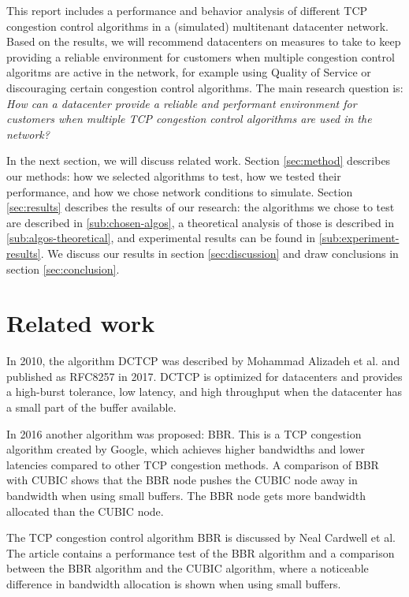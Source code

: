 \documentclass{article}
\begin{document}
This report includes a performance and behavior analysis of different TCP congestion control algorithms in a (simulated) multitenant datacenter network. Based on the results, we will recommend datacenters on measures to take to keep providing a reliable environment for customers when multiple congestion control algoritms are active in the network, for example using Quality of Service or discouraging certain congestion control algorithms. The main research question is: {\it How can a datacenter provide a reliable and performant environment for customers when multiple TCP congestion control algorithms are used in the
network?}

In the next section, we will discuss related work. Section \ref{sec:method}
describes our methods: how we selected algorithms to test, how we tested their
performance, and how we chose network conditions to simulate. Section
\ref{sec:results} describes the results of our research: the algorithms we
chose to test are described in \ref{sub:chosen-algos}, a theoretical analysis
of those is described in \ref{sub:algos-theoretical}, and experimental results
can be found in \ref{sub:experiment-results}. We discuss our results in section
\ref{sec:discussion} and draw conclusions in section \ref{sec:conclusion}.


\section{Related work}

In 2010, the algorithm DCTCP was described by Mohammad Alizadeh et
al.\cite{dctcp-congestion-original} and published as
RFC8257\cite{dctcp-congestion} in 2017. DCTCP is optimized for datacenters and
provides a high-burst tolerance, low latency, and high throughput when the
datacenter has a small part of the buffer available\cite{dctcp-congestion}.

In 2016 another algorithm was proposed: BBR. This is a TCP congestion algorithm
created by Google, which achieves higher bandwidths and lower latencies
compared to other TCP congestion methods\cite{bbr-congestion}. A comparison of
BBR with CUBIC\cite{bbr-congestion-comparison} shows that the BBR node pushes
the CUBIC node away in bandwidth when using small buffers. The BBR node gets
more bandwidth allocated than the CUBIC node.

The TCP congestion control algorithm BBR is discussed by Neal Cardwell et
al.\cite{bbr-congestion} The article contains a performance test of the BBR
algorithm and a comparison between the BBR algorithm and the CUBIC algorithm,
where a noticeable difference in bandwidth allocation is shown when using small
buffers.
\end{document}
